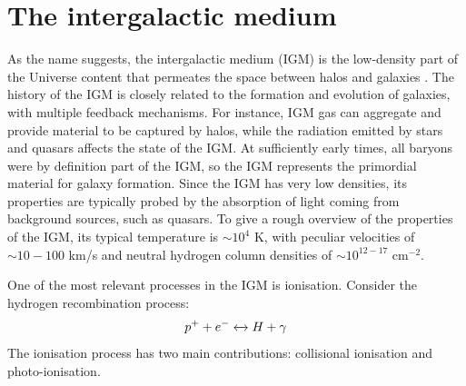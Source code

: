 \section{The intergalactic medium}\label{sec:IGM}
As the name suggests, the intergalactic medium (IGM) is the low-density part of the Universe content that permeates the space between halos and galaxies \cite{Mo2010}. The history of the IGM is closely related to the formation and evolution of galaxies, with multiple feedback mechanisms. For instance, IGM gas can aggregate and provide material to be captured by halos, while the radiation emitted by stars and quasars affects the state of the IGM. At sufficiently early times, all baryons were by definition part of the IGM, so the IGM represents the primordial material for galaxy formation. Since the IGM has very low densities, its properties are typically probed by the absorption of light coming from background sources, such as quasars. To give a rough overview of the properties of the IGM, its typical temperature is $\sim 10^4$ K, with peculiar velocities of $\sim 10-100$ km/s and neutral hydrogen column densities of $\sim 10^{12-17}$ cm$^{-2}$.

One of the most relevant processes in the IGM is ionisation. Consider the hydrogen recombination process:
$$p^+ + e^- \xleftrightarrow \ H +\gamma$$
The ionisation process has two main contributions: collisional ionisation and photo-ionisation.

